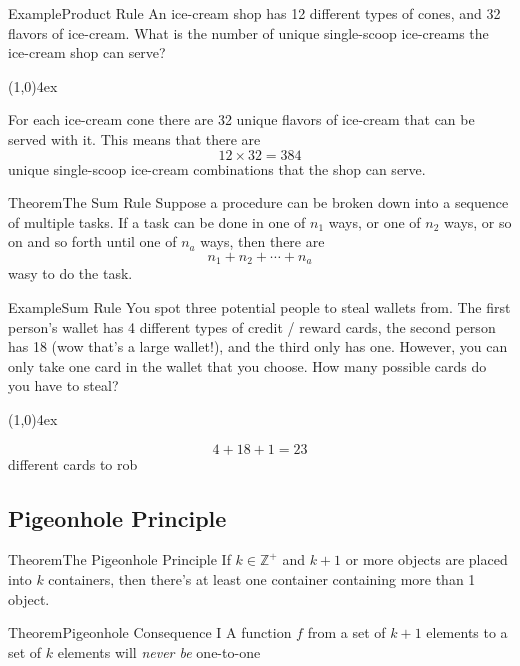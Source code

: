 \documentclass{MathNotes}
\newenvironment{example}[1]{\begin{BlueBox}{Example}{#1}}{\end{BlueBox}}
\newenvironment{theorem}[1]{\begin{GrayBox}{Theorem}{#1}}{\end{GrayBox}}
\newcommand{\br}{
	\begin{center}
		\line(1,0){4ex}
	\end{center}
}
\begin{document}
\begin{example}{Product Rule}\label{ex:product-rule}
	An ice-cream shop has 12 different types of cones, and 32 flavors of ice-cream.
	What is the number of unique single-scoop ice-creams the ice-cream shop can
	serve?
	\br{}
	For each ice-cream cone there are 32 unique flavors of ice-cream that can
	be served with it. This means that there are\[12\times 32=384\] unique
	single-scoop ice-cream combinations that the shop can serve.
\end{example}

\begin{theorem}{The Sum Rule}\label{th:sum-rule}
	Suppose a procedure can be broken down into a sequence of multiple tasks.
	If a task can be done in one of $n_1$ ways, or one of $n_2$ ways, or so
	on and so forth until one of $n_a$ ways, then there are
	\[n_1+n_2+\cdots+n_a\] wasy to do the task.
\end{theorem}

\begin{example}{Sum Rule}\label{ex:sum-rule}
	You spot three potential people to steal wallets from. The first person's
	wallet has 4 different types of credit / reward cards, the second person
	has 18 (wow that's a large wallet!), and the third only has one. However,
	you can only take one card in the wallet that you choose. How many possible
	cards do you have to steal?
	\br
	\[4+18+1=23\]
	different cards to rob 
\end{example}

\subsection{Pigeonhole Principle}\label{sec:pigeonhole-principle}
\begin{multicols}{2}
	\begin{theorem}{The Pigeonhole Principle}\label{th:pigeonhole}
		If $k\in\mathbb{Z}^+$ and $k+1$ or more objects are placed into $k$
		containers, then there's at least one container containing more than 1
		object.
	\end{theorem}
	\begin{theorem}{Pigeonhole Consequence I}\label{th:pigeonhole-consequence-1}
		A function $f$ from a set of $k+1$ elements to a set of $k$ elements
		will \textit{never be} one-to-one
	\end{theorem}
\end{multicols}
\end{document}
